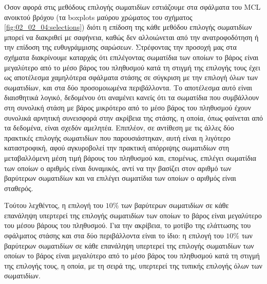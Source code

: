 Όσον αφορά στις μεθόδους επιλογής σωματιδίων εστιάζουμε στα σφάλματα του MCL
ανοικτού βρόχου (τα boxplots μαύρου χρώματος του σχήματος
\ref{fig:02_02_04:selections}) διότι η επίδοση της κάθε μεθόδου επιλογής
σωματιδίων μπορεί να διακριθεί με σαφήνεια, καθώς δεν αλλοιώνεται από την
ανατροφοδότηση ή την επίδοση της ευθυγράμμισης σαρώσεων. Στρέφοντας την προσοχή
μας στα σχήματα διακρίνουμε καταρχάς ότι επιλέγοντας σωματίδια των οποίων το
βάρος είναι μεγαλύτερο από το μέσο βάρος του πληθυσμού κατά τη στιγμή της
επιλογής τους έχει ως αποτέλεσμα χαμηλότερα σφάλματα στάσης σε σύγκριση με την
επιλογή όλων των σωματιδίων, και στα δύο προσομοιωμένα περιβάλλοντα. Το
αποτέλεσμα αυτό είναι διαισθητικά λογικό, δεδομένου ότι αναμένει κανείς ότι τα
σωματίδια που συμβάλλουν στη συνολική στάση με βάρος μικρότερο από το μέσο
βάρος του πληθυσμού έχουν συνολικά αρνητική συνεισφορά στην ακρίβεια της
στάσης, η οποία, όπως φαίνεται από τα δεδομένα, είναι σχεδόν αμελητέα.
Επιπλέον, σε αντίθεση με τις άλλες δύο πρακτικές επιλογής σωματιδίων που
παρουσιάστηκαν, αυτή είναι η λιγότερο καταστροφική, αφού αγκυροβολεί την
πρακτική απόρριψης σωματιδίων στη μεταβαλλόμενη μέση τιμή βάρους του πληθυσμού
και, επομένως, επιλέγει σωματίδια των οποίων ο αριθμός είναι δυναμικός, αντί να
την βασίζει στον αριθμό των βαρύτερων σωματιδίων και να επιλέγει σωματίδια των
οποίων ο αριθμός είναι σταθερός.

Τούτου λεχθέντος, η επιλογή του $10\%$ των βαρύτερων σωματιδίων σε κάθε
επανάληψη υπερτερεί της επιλογής σωματιδίων των οποίων το βάρος είναι
μεγαλύτερο του μέσου βάρους του πληθυσμού. Για την ακρίβεια, το μοτίβο της
ελάττωσης του σφάλματος στάσης και στα δύο περιβάλλοντα είναι το ίδιο: η
επιλογή του $10\%$ των βαρύτερων σωματιδίων σε κάθε επανάληψη υπερτερεί της
επιλογής σωματιδίων των οποίων το βάρος είναι μεγαλύτερο από το μέσο βάρος του
πληθυσμού κατά τη στιγμή της επιλογής τους, η οποία, με τη σειρά της, υπερτερεί
της τυπικής επιλογής όλων των σωματιδίων.

